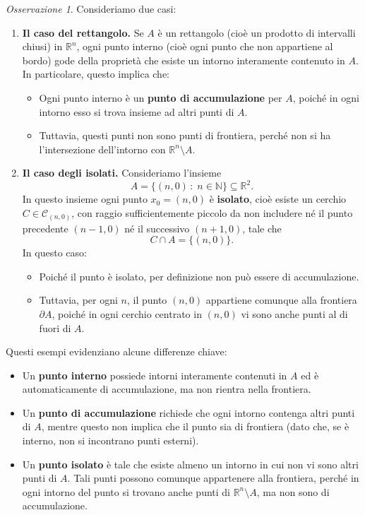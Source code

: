 \documentclass{article}
\theoremstyle{plain}
\theoremstyle{definition}
\theoremstyle{remark}
\newtheorem{rem}{Osservazione}
\begin{document}
\begin{rem}
Consideriamo due casi:
\begin{enumerate}
    \item \textbf{Il caso del rettangolo.}  
    Se $A$ è un rettangolo (cioè un prodotto di intervalli chiusi) in $\mathbb{R}^n$, ogni punto interno (cioè ogni punto che non appartiene al bordo) gode della proprietà che esiste un intorno interamente contenuto in $A$.  
    In particolare, questo implica che:
    \begin{itemize}
        \item Ogni punto interno è un \textbf{punto di accumulazione} per $A$, poiché in ogni intorno esso si trova insieme ad altri punti di $A$.
        \item Tuttavia, questi punti non sono punti di frontiera, perché non si ha l'intersezione dell'intorno con $\mathbb{R}^n\setminus A$.
    \end{itemize}

    \item \textbf{Il caso degli isolati.}  
    Consideriamo l'insieme 
    \[
    A=\{(n,0)\,:\;n\in\mathbb{N}\}\subseteq\mathbb{R}^2.
    \]
    In questo insieme ogni punto $x_0=(n,0)$ è \textbf{isolato}, cioè esiste un cerchio $C\in\mathcal{C}_{(n,0)}$, con raggio sufficientemente piccolo da non includere né il punto precedente $(n-1,0)$ né il successivo $(n+1,0)$, tale che
    \[
    C\cap A=\{(n,0)\}.
    \]
    In questo caso:
    \begin{itemize}
        \item Poiché il punto è isolato, per definizione non può essere di accumulazione.
        \item Tuttavia, per ogni $n$, il punto $(n,0)$ appartiene comunque alla frontiera $\partial A$, poiché in ogni cerchio centrato in $(n,0)$ vi sono anche punti al di fuori di $A$. 
    \end{itemize}
\end{enumerate}

Questi esempi evidenziano alcune differenze chiave:
\begin{itemize}
    \item Un \textbf{punto interno} possiede intorni interamente contenuti in $A$ ed è automaticamente di accumulazione, ma non rientra nella frontiera.
    \item Un \textbf{punto di accumulazione} richiede che ogni intorno contenga altri punti di $A$, mentre questo non implica che il punto sia di frontiera (dato che, se è interno, non si incontrano punti esterni).
    \item Un \textbf{punto isolato} è tale che esiste almeno un intorno in cui non vi sono altri punti di $A$. Tali punti possono comunque appartenere alla frontiera, perché in ogni intorno del punto si trovano anche punti di $\mathbb{R}^n\setminus A$, ma non sono di accumulazione.
\end{itemize}
\end{rem}
\end{document}
